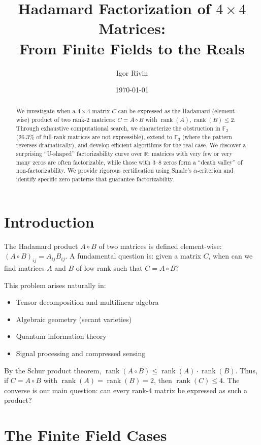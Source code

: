 \documentclass{article}
\title{Hadamard Factorization of $4 \times 4$ Matrices: \\ From Finite Fields to the Reals}
\author{Igor Rivin}
\date{\today}
\theoremstyle{definition}
\DeclareMathOperator{\rank}{rank}
\begin{document}
\maketitle

\begin{abstract}
We investigate when a $4 \times 4$ matrix $C$ can be expressed as the Hadamard (element-wise) product of two rank-2 matrices: $C = A \circ B$ with $\rank(A), \rank(B) \leq 2$. Through exhaustive computational search, we characterize the obstruction in $\mathbb{F}_2$ (26.3\% of full-rank matrices are not expressible), extend to $\mathbb{F}_3$ (where the pattern reverses dramatically), and develop efficient algorithms for the real case. We discover a surprising ``U-shaped'' factorizability curve over $\mathbb{R}$: matrices with very few or very many zeros are often factorizable, while those with 3--8 zeros form a ``death valley'' of non-factorizability. We provide rigorous certification using Smale's $\alpha$-criterion and identify specific zero patterns that guarantee factorizability.
\end{abstract}

\section{Introduction}

The Hadamard product $A \circ B$ of two matrices is defined element-wise: $(A \circ B)_{ij} = A_{ij} B_{ij}$. A fundamental question is: given a matrix $C$, when can we find matrices $A$ and $B$ of low rank such that $C = A \circ B$?

This problem arises naturally in:
\begin{itemize}
\item Tensor decomposition and multilinear algebra
\item Algebraic geometry (secant varieties)
\item Quantum information theory
\item Signal processing and compressed sensing
\end{itemize}

By the Schur product theorem, $\rank(A \circ B) \leq \rank(A) \cdot \rank(B)$. Thus, if $C = A \circ B$ with $\rank(A) = \rank(B) = 2$, then $\rank(C) \leq 4$. The converse is our main question: can every rank-4 matrix be expressed as such a product?

\section{The Finite Field Cases}
\end{document}
